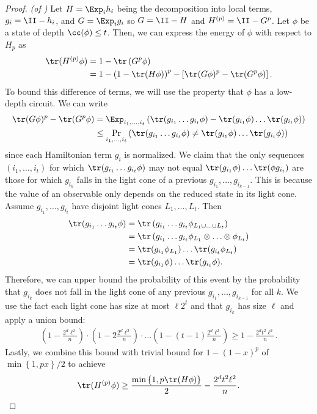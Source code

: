 \documentclass{toc}
\begin{document}
\begin{proof}\textit{(of )}
Let $H = \Exp_i h_i$ being the decomposition into local terms, $g_i = \II - h_i$, and $G = \Exp_i g_i$ so $G = \II - H$ and $H^{(p)} = \II - G^p$.
Let $\phi$ be a state of depth $\cc(\phi) \leq t$. Then, we can express the energy of $\phi$ with respect to $H_p$ as
\begin{align}
    \tr(H^{(p)} \phi) &= 1 - \tr \left( G^p \phi \right) \\
    &= 1 - \left( 1 - \tr(H \phi) \right)^p - \left[ \tr(G \phi)^p - \tr(G^p \phi) \right].
\end{align}
To bound this difference of terms, we will use the property that $\phi$ has a low-depth circuit.
%
We can write
\begin{align}
    \tr(G \phi)^p - \tr(G^p \phi) &= \Exp_{i_1, \ldots, i_t} \left( \tr(g_{i_1} \ldots g_{i_t} \phi) - \tr(g_{i_1} \phi) \ldots \tr( g_{i_t} \phi) \right) \\
    &\leq \Pr_{i_1, \ldots, i_t} \left( \tr(g_{i_1} \ldots g_{i_t} \phi) \neq \tr(g_{i_1} \phi) \ldots \tr( g_{i_t} \phi) \right)
\end{align}
since each Hamiltonian term $g_i$ is normalized. We claim that the only sequences $(i_1, \ldots, i_t)$ for which $\tr(g_{i_1} \ldots g_{i_t} \phi)$ may not equal $\tr(g_{i_1} \phi) \ldots \tr(\phi g_{i_t})$ are those for which $g_{i_k}$ falls in the light cone of a previous $g_{i_1}, \ldots, g_{i_{k-1}}$. This is because the value of an observable only depends on the reduced state in its light cone. Assume $g_{i_1}, \ldots, g_{i_t}$ have disjoint light cones $L_1, \ldots, L_t$. Then
\begin{align}
\tr(g_{i_1} \ldots g_{i_t} \phi) &= \tr \left( g_{i_1} \ldots g_{i_t} \phi_{L_1 \cup \ldots \cup L_t} \right) \\
&= \tr \left( g_{i_1} \ldots g_{i_t} \phi_{L_1} \otimes \ldots \otimes \phi_{L_t} \right) \\
&= \tr(g_{i_1} \phi_{L_1}) \ldots \tr(g_{i_t} \phi_{L_t}) \\
&= \tr(g_{i_1} \phi) \ldots \tr(g_{i_t} \phi).
\end{align}
Therefore, we can upper bound the probability of this event by the probability that $g_{i_k}$ does not fall in the light cone of any previous $g_{i_1}, \ldots, g_{i_{k-1}}$ for all $k$. We use the fact each light cone has size at most $\ell 2^t$ and that $g_{i_k}$ has size $\ell$ and apply a union bound:
\begin{align}
    \left( 1 - \frac{2^d \ell^2}{n} \right) \cdot \left( 1 - 2 \frac{2^d \ell^2}{n} \right) \cdot \ldots \left( 1 - (t-1) \frac{2^d \ell^2}{n} \right) \geq 1 - \frac{2^d t^2 \ell^2}{n}.
\end{align}
Lastly, we combine this bound with trivial bound for $1 - \left( 1 - x \right)^p $ of $\min \left\{1, p x\right\} / 2$ to achieve
\begin{align}
\tr(H^{(p)} \phi) \geq \frac{\min\left\{1, p \tr(H \phi)\right\}}{2} - \frac{2^d t^2 \ell^2}{n}.
\end{align}
\end{proof}
\end{document}
